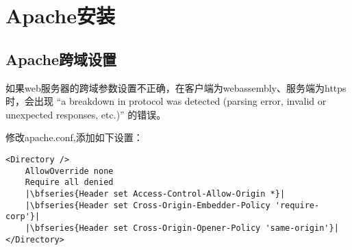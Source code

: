 \chapter{Apache安装}

\section{Apache跨域设置}

如果web服务器的跨域参数设置不正确，在客户端为webassembly、服务端为https时，会出现
“a breakdown in protocol was detected (parsing error, invalid or unexpected responses, etc.)”
的错误。

修改apache.conf,添加如下设置：
\begin{verbatim}
<Directory />
	AllowOverride none
	Require all denied
	|\bfseries{Header set Access-Control-Allow-Origin *}|
	|\bfseries{Header set Cross-Origin-Embedder-Policy 'require-corp'}|
	|\bfseries{Header set Cross-Origin-Opener-Policy 'same-origin'}|
</Directory>
\end{verbatim}
